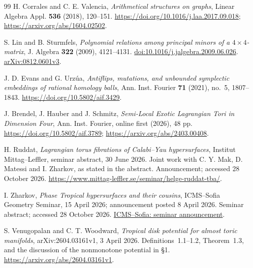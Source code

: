 \begin{thebibliography}{99}
H. Corrales and C. E. Valencia,
\emph{Arithmetical structures on graphs},
Linear Algebra Appl. \textbf{536} (2018), 120--151.
\url{https://doi.org/10.1016/j.laa.2017.09.018};
\url{https://arxiv.org/abs/1604.02502}.



S. Lin and B. Sturmfels,
\emph{Polynomial relations among principal minors of a $4\times4$-matrix},
J. Algebra \textbf{322} (2009), 4121--4131.
\href{https://doi.org/10.1016/j.jalgebra.2009.06.026}{doi:10.1016/j.jalgebra.2009.06.026}.
\href{https://arxiv.org/abs/0812.0601}{arXiv:0812.0601v3}.


J. D. Evans and G. Urz\'ua,
\emph{Antiflips, mutations, and unbounded symplectic embeddings of rational homology balls},
Ann. Inst. Fourier \textbf{71} (2021), no.~5, 1807--1843.
\url{https://doi.org/10.5802/aif.3429}.

J. Brendel, J. Hauber and J. Schmitz,
\emph{Semi-Local Exotic Lagrangian Tori in Dimension Four},
Ann. Inst. Fourier, online first (2026), 48 pp.
\url{https://doi.org/10.5802/aif.3789};
\url{https://arxiv.org/abs/2403.00408}.

H. Ruddat,
\emph{Lagrangian torus fibrations of Calabi--Yau hypersurfaces},
Institut Mittag--Leffler, seminar abstract, 30 June 2026.
Joint work with C. Y. Mak, D. Matessi and I. Zharkov, as stated in the abstract.
Announcement; accessed 28 October 2026.
\url{https://www.mittag-leffler.se/seminar/helge-ruddat-tba/}.

I. Zharkov,
\emph{Phase Tropical hypersurfaces and their cousins},
ICMS--Sofia Geometry Seminar, 15 April 2026; announcement posted 8 April 2026.
Seminar abstract; accessed 28 October 2026.
\href{https://icms.bg/phase-tropical-hypersurfaces-and-their-cousins-geometry-seminar-talk-by-ilia-zharkov/}{ICMS--Sofia: seminar announcement}.


S. Venugopalan and C. T. Woodward,
\emph{Tropical disk potential for almost toric manifolds},
arXiv:2604.03161v1, 3 April 2026.
Definitions~1.1--1.2, Theorem~1.3, and the discussion of the nonmonotone potential in \S1.
\url{https://arxiv.org/abs/2604.03161v1}.

\end{thebibliography}
